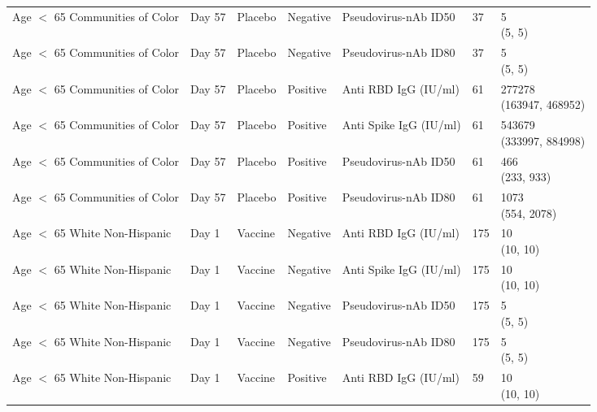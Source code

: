 \documentclass[]{book}
\theoremstyle{definition}
\theoremstyle{definition}
\theoremstyle{definition}
\newcommand{\1}{\mathbbm{1}}
\begin{document}
\begin{landscape}
\begin{ThreePartTable}
\begin{longtable}[t]{>{\raggedright\arraybackslash}p{7cm}llllll}
\hspace{1em}Age $<$ 65 Communities of Color & Day 57 & Placebo & Negative & Pseudovirus-nAb ID50 & 37 & \makecell[l]{5\\(5, 5)}\\
\hspace{1em}Age $<$ 65 Communities of Color & Day 57 & Placebo & Negative & Pseudovirus-nAb ID80 & 37 & \makecell[l]{5\\(5, 5)}\\
\hspace{1em}Age $<$ 65 Communities of Color & Day 57 & Placebo & Positive & Anti RBD IgG (IU/ml) & 61 & \makecell[l]{277278\\(163947, 468952)}\\
\hspace{1em}Age $<$ 65 Communities of Color & Day 57 & Placebo & Positive & Anti Spike IgG (IU/ml) & 61 & \makecell[l]{543679\\(333997, 884998)}\\
\hspace{1em}Age $<$ 65 Communities of Color & Day 57 & Placebo & Positive & Pseudovirus-nAb ID50 & 61 & \makecell[l]{466\\(233, 933)}\\
\hspace{1em}Age $<$ 65 Communities of Color & Day 57 & Placebo & Positive & Pseudovirus-nAb ID80 & 61 & \makecell[l]{1073\\(554, 2078)}\\
\hspace{1em}Age $<$ 65 White Non-Hispanic & Day 1 & Vaccine & Negative & Anti RBD IgG (IU/ml) & 175 & \makecell[l]{10\\(10, 10)}\\
\hspace{1em}Age $<$ 65 White Non-Hispanic & Day 1 & Vaccine & Negative & Anti Spike IgG (IU/ml) & 175 & \makecell[l]{10\\(10, 10)}\\
\hspace{1em}Age $<$ 65 White Non-Hispanic & Day 1 & Vaccine & Negative & Pseudovirus-nAb ID50 & 175 & \makecell[l]{5\\(5, 5)}\\
\hspace{1em}Age $<$ 65 White Non-Hispanic & Day 1 & Vaccine & Negative & Pseudovirus-nAb ID80 & 175 & \makecell[l]{5\\(5, 5)}\\
\hspace{1em}Age $<$ 65 White Non-Hispanic & Day 1 & Vaccine & Positive & Anti RBD IgG (IU/ml) & 59 & \makecell[l]{10\\(10, 10)}\\

\end{longtable}
\end{ThreePartTable}
\end{landscape}
\end{document}
